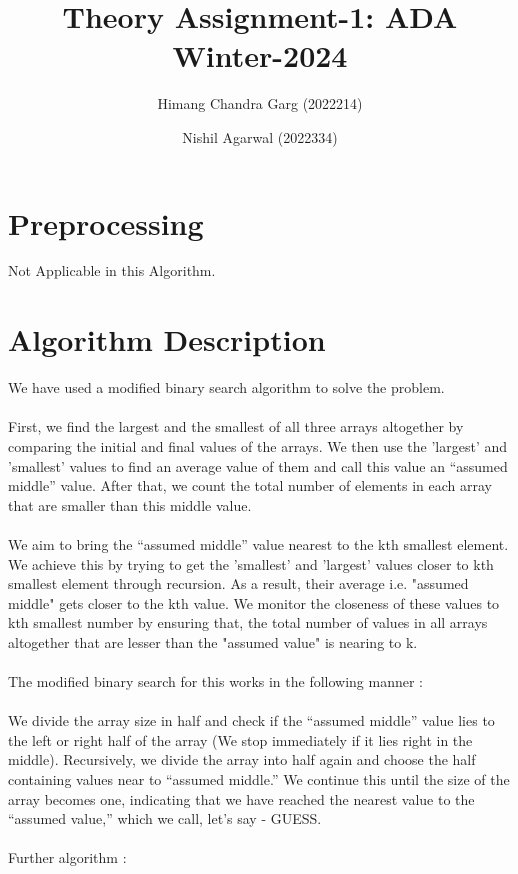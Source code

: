\documentclass{article}
\title{Theory Assignment-1: ADA Winter-2024}
\author{Himang Chandra Garg (2022214) \and Nishil Agarwal (2022334)}
\date{}
\begin{document}
\maketitle

\section{Preprocessing}
Not Applicable in this Algorithm.

\section{Algorithm Description}
We have used a modified binary search algorithm to solve the problem.
\\\\
First, we find the largest and the smallest of all three arrays altogether by comparing the initial and final values of the arrays. We then use the 'largest' and 'smallest' values to find an average value of them and call this value an “assumed middle” value. After that, we count the total number of elements in each array that are smaller than this middle value. 
\\\\
We aim to bring the “assumed middle” value nearest to the kth smallest element. We achieve this by trying to get the 'smallest' and 'largest' values closer to kth smallest element through recursion. As a result, their average i.e. "assumed middle" gets closer to the kth value. We monitor the closeness of these values to kth smallest number by ensuring that, the total number of values in all arrays altogether that are lesser than the "assumed value" is nearing to k.
\\\\
The modified binary search for this works in the following manner : 
\\\\ We divide the array size in half and check if the “assumed middle” value lies to the left or right half of the array (We stop immediately if it lies right in the middle). Recursively, we divide the array into half again and choose the half containing values near to “assumed middle.” We continue this until the size of the array becomes one, indicating that we have reached the nearest value to the “assumed value,” which we call, let’s say - GUESS.
\\\\
Further algorithm :
\\\\
\end{document}

